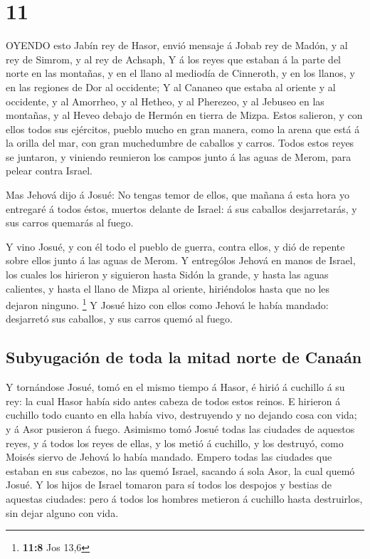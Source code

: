 \hypertarget{section-10}{%
\section{11}\label{section-10}}

 OYENDO esto Jabín rey de Hasor, envió mensaje á Jobab rey
de Madón, y al rey de Simrom, y al rey de Achsaph,  Y á los
reyes que estaban á la parte del norte en las montañas, y en el llano al
mediodía de Cinneroth, y en los llanos, y en las regiones de Dor al
occidente;  Y al Cananeo que estaba al oriente y al
occidente, y al Amorrheo, y al Hetheo, y al Pherezeo, y al Jebuseo en
las montañas, y al Heveo debajo de Hermón en tierra de Mizpa.
 Estos salieron, y con ellos todos sus ejércitos, pueblo
mucho en gran manera, como la arena que está á la orilla del mar, con
gran muchedumbre de caballos y carros.  Todos estos reyes se
juntaron, y viniendo reunieron los campos junto á las aguas de Merom,
para pelear contra Israel.

 Mas Jehová dijo á Josué: No tengas temor de ellos, que
mañana á esta hora yo entregaré á todos éstos, muertos delante de
Israel: á sus caballos desjarretarás, y sus carros quemarás al fuego.

 Y vino Josué, y con él todo el pueblo de guerra, contra
ellos, y dió de repente sobre ellos junto á las aguas de Merom.
 Y entrególos Jehová en manos de Israel, los cuales los
hirieron y siguieron hasta Sidón la grande, y hasta las aguas calientes,
y hasta el llano de Mizpa al oriente, hiriéndolos hasta que no les
dejaron ninguno. \footnote{\textbf{11:8} Jos 13,6}  Y Josué
hizo con ellos como Jehová le había mandado: desjarretó sus caballos, y
sus carros quemó al fuego.

\hypertarget{subyugaciuxf3n-de-toda-la-mitad-norte-de-canauxe1n}{%
\subsection{Subyugación de toda la mitad norte de
Canaán}\label{subyugaciuxf3n-de-toda-la-mitad-norte-de-canauxe1n}}

 Y tornándose Josué, tomó en el mismo tiempo á Hasor, é
hirió á cuchillo á su rey: la cual Hasor había sido antes cabeza de
todos estos reinos.  E hirieron á cuchillo todo cuanto en
ella había vivo, destruyendo y no dejando cosa con vida; y á Asor
pusieron á fuego.  Asimismo tomó Josué todas las ciudades
de aquestos reyes, y á todos los reyes de ellas, y los metió á cuchillo,
y los destruyó, como Moisés siervo de Jehová lo había mandado.
 Empero todas las ciudades que estaban en sus cabezos, no
las quemó Israel, sacando á sola Asor, la cual quemó Josué.
 Y los hijos de Israel tomaron para sí todos los despojos y
bestias de aquestas ciudades: pero á todos los hombres metieron á
cuchillo hasta destruirlos, sin dejar alguno con vida.

